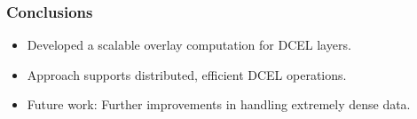 \documentclass{beamer}
\begin{document}
\begin{frame}
    \frametitle{Conclusions}
    \begin{itemize}
        \item Developed a scalable overlay computation for DCEL layers.
        \item Approach supports distributed, efficient DCEL operations.
        \item Future work: Further improvements in handling extremely dense data.
    \end{itemize}
\end{frame}
\end{document}
